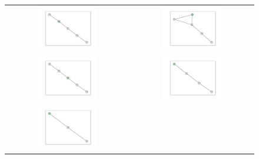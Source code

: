 \documentclass[12pt, a4paper]{extarticle}
\begin{document}
\begin{figure}\centering\begin{tabularx}{\textwidth}{cc}
\includegraphics[width=0.5\textwidth]{task11-graphlets/5_21-17-20-23-24.pdf} &
\includegraphics[width=0.5\textwidth]{task11-graphlets/5_16-21-17-25-23.pdf} \\
\includegraphics[width=0.5\textwidth]{task11-graphlets/5_14-21-18-19-23.pdf} &
\includegraphics[width=0.5\textwidth]{task11-graphlets/4_14-13-21-23.pdf} \\
\includegraphics[width=0.5\textwidth]{task11-graphlets/3_18-22-23.pdf} &

\end{tabularx}
\end{figure}
\end{document}
